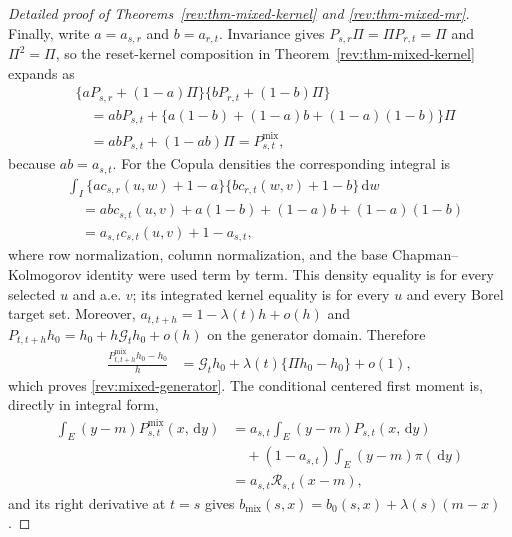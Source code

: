 \documentclass[11pt]{article}
\theoremstyle{remark}
\newcommand{\dd}{\,\mathrm d}
\begin{document}
\begin{proof}[Detailed proof of Theorems~\ref{rev:thm-mixed-kernel} and
\ref{rev:thm-mixed-mr}]
Finally, write $a=a_{s,r}$ and $b=a_{r,t}$.  Invariance gives
$P_{s,r}\Pi=\Pi P_{r,t}=\Pi$ and $\Pi^2=\Pi$, so the reset-kernel composition
in Theorem~\ref{rev:thm-mixed-kernel} expands as
\begin{align*}
&\{aP_{s,r}+(1-a)\Pi\}
 \{bP_{r,t}+(1-b)\Pi\}\\
&\quad=abP_{s,t}
 +\{a(1-b)+(1-a)b+(1-a)(1-b)\}\Pi\\
&\quad=abP_{s,t}+(1-ab)\Pi
=P^{\mathrm{mix}}_{s,t},
\end{align*}
because $ab=a_{s,t}$.  For the Copula densities the corresponding integral is
\begin{align*}
&\int_I\{ac_{s,r}(u,w)+1-a\}
          \{bc_{r,t}(w,v)+1-b\}\dd w\\
&\quad=ab c_{s,t}(u,v)+a(1-b)+(1-a)b+(1-a)(1-b)\\
&\quad=a_{s,t}c_{s,t}(u,v)+1-a_{s,t},
\end{align*}
where row normalization, column normalization, and the base
Chapman--Kolmogorov identity were used term by term.  This density equality is
for every selected $u$ and a.e. $v$; its integrated kernel equality is for every
$u$ and every Borel target set.  Moreover,
$a_{t,t+h}=1-\lambda(t)h+o(h)$ and
$P_{t,t+h}h_0=h_0+h\mathcal G_th_0+o(h)$ on the generator domain.  Therefore
\begin{align*}
\frac{P^{\mathrm{mix}}_{t,t+h}h_0-h_0}{h}
&=\mathcal G_th_0
 +\lambda(t)\{\Pi h_0-h_0\}+o(1),
\end{align*}
which proves \eqref{rev:mixed-generator}.  The conditional centered first
moment is, directly in integral form,
\begin{align*}
\int_E(y-m)P^{\mathrm{mix}}_{s,t}(x,\dd y)
&=a_{s,t}\int_E(y-m)P_{s,t}(x,\dd y)\\
&\quad+(1-a_{s,t})\int_E(y-m)\pi(\dd y)\\
&=a_{s,t}\mathcal R_{s,t}(x-m),
\end{align*}
and its right derivative at $t=s$ gives
$b_{\mathrm{mix}}(s,x)=b_0(s,x)+\lambda(s)(m-x)$.
\end{proof}

\clearpage


\end{document}
